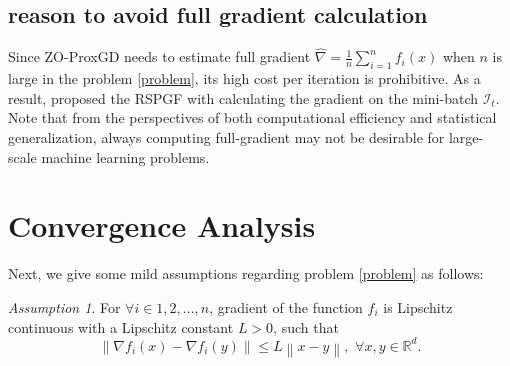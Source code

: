 \documentclass{article}
\newcommand*{\R}{\mathbb{R}}
\newcommand{\norm}[1]{\left\lVert#1\right\rVert}
\theoremstyle{definition}
\theoremstyle{remark}
\newtheorem{assumption}[theorem]{Assumption}
\begin{document}
\subsection{reason to avoid full gradient calculation}
{\color{Green}
Since ZO-ProxGD needs to estimate full gradient
$\hat{\nabla}=\frac{1}{n}\sum_{i=1}^n f_i(x)$ when $n$ is large in the problem \eqref{problem}, its high cost per iteration is prohibitive. As a result, \cite{ghadimi2016accelerated} proposed the RSPGF with calculating the gradient on the mini-batch $\mathcal{I}_t$. {\color{Violet} Note that from the perspectives of both computational efficiency and statistical generalization, always computing full-gradient may not be desirable for large-scale machine learning problems.}
}

\section{Convergence Analysis}
{\color{Green}
Next, we give some
mild assumptions regarding problem \eqref{problem} as follows:
}
\begin{assumption}\label{Lip-Zoo}
For $\forall i\in{1,2,\ldots,n}$, gradient of the function $f_i$ is Lipschitz continuous with a Lipschitz constant $L > 0$, such that 
\[
\norm{\nabla f_i(x) - \nabla f_i(y)}\leq L \norm{x-y},\,\,\forall x,y\in\R^d.
\]
\end{assumption}
\end{document}
